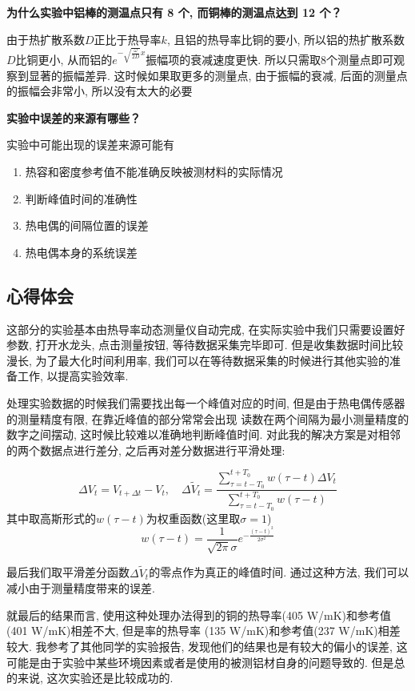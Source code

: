 \documentclass[zihao=5, UTF8]{article}
\theoremstyle{MyLineTheoremStyle} %
\theoremstyle{MyBlockTheoremStyle} %
\theoremstyle{MySubsubsectionStyle} %
\begin{document}
\textbf{为什么实验中铝棒的测温点只有 8 个, 而铜棒的测温点达到 12 个？}

由于热扩散系数$D$正比于热导率$k$, 且铝的热导率比铜的要小, 所以铝的热扩散系数$D$比铜更小, 
从而铝的$e^{-\sqrt{\frac{\omega}{2D}} x}$振幅项的衰减速度更快. 
所以只需取8个测量点即可观察到显著的振幅差异. 
这时候如果取更多的测量点, 由于振幅的衰减, 后面的测量点的振幅会非常小, 所以没有太大的必要

\textbf{实验中误差的来源有哪些？}

实验中可能出现的误差来源可能有
\begin{enumerate}
    \item 热容和密度参考值不能准确反映被测材料的实际情况 
    \item 判断峰值时间的准确性
    \item 热电偶的间隔位置的误差
    \item 热电偶本身的系统误差
\end{enumerate}
\subsection{心得体会}
这部分的实验基本由热导率动态测量仪自动完成, 在实际实验中我们只需要设置好参数, 打开水龙头, 点击测量按钮, 等待数据采集完毕即可.
但是收集数据时间比较漫长, 为了最大化时间利用率, 我们可以在等待数据采集的时候进行其他实验的准备工作, 以提高实验效率.

处理实验数据的时候我们需要找出每一个峰值对应的时间, 但是由于热电偶传感器的测量精度有限, 在靠近峰值的部分常常会出现
读数在两个间隔为最小测量精度的数字之间摆动, 这时候比较难以准确地判断峰值时间. 对此我的解决方案是对相邻的两个数据点进行差分,
之后再对差分数据进行平滑处理:

\begin{equation}
    \Delta V_t = V_{t + \Delta t} - V_t, \quad \Delta \tilde{V}_t = 
    \dfrac{\sum_{\tau = t -T_0}^{t + T_0} w(\tau - t)\Delta V_t}{\sum_{\tau = t -T_0}^{t + T_0} w(\tau - t)}
\end{equation}
其中取高斯形式的$w(\tau - t)$为权重函数(这里取$\sigma = 1$)
\begin{equation}
    w(\tau - t) = \frac{1}{\sqrt{2\pi}\sigma}e^{-\frac{(\tau - t)^2}{2\sigma^2}}
\end{equation}

最后我们取平滑差分函数$\Delta \tilde{V}_t$的零点作为真正的峰值时间. 通过这种方法, 我们可以减小由于测量精度带来的误差.

就最后的结果而言, 使用这种处理办法得到的铜的热导率(405 W/mK)和参考值(401 W/mK)相差不大, 但是率的热导率
(135 W/mK)和参考值(237 W/mK)相差较大. 我参考了其他同学的实验报告, 发现他们的结果也是有较大的偏小的误差,
这可能是由于实验中某些环境因素或者是使用的被测铝材自身的问题导致的. 但是总的来说, 这次实验还是比较成功的.
\end{document}
